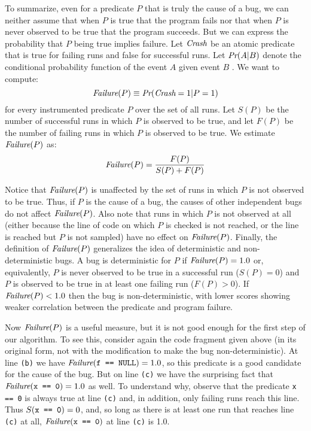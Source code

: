 To summarize, even for a predicate $P$ that is truly the cause of a bug, we can neither assume that
when $P$ is true that
the program fails nor that when $P$ is never observed to be true  that
the program succeeds.
But we can express the probability that $P$
being true implies failure.  Let $\textit{Crash}$ be an atomic predicate that is
true for failing runs and false for successful runs.  Let $\textit{Pr}(A | B)$ denote
the conditional probability function of the event $A$ given event $B$ .  
We want to compute:
\[ \textit{Failure}(P) \equiv \textit{Pr}(\textit{Crash} = 1 | P = 1) \]
for every instrumented predicate $P$ over the set of all runs.  Let $S(P)$ be the number
of successful runs in which $P$ is observed to be true, and let $F(P)$ be the number of
failing runs in which $P$ is observed to be true.  
We estimate $\textit{Failure}(P)$ as:
\[ \textit{Failure}(P) = \frac{F(P)}{S(P) + F(P)} \]

Notice that $\textit{Failure}(P)$ is unaffected by the set of runs in which
$P$ is not observed to be true.  Thus, if $P$ is the cause of a bug, the
causes of other independent bugs do not affect $\textit{Failure}(P)$.
Also note that runs in which $P$ is not observed at all (either because
the line of code on which $P$ is checked is not reached, or the line is reached
but $P$ is not sampled) have no effect on $\textit{Failure}(P)$.
Finally, the definition of $\textit{Failure}(P)$
generalizes the idea of deterministic and non-deterministic bugs.  A
bug is deterministic for $P$ if $\textit{Failure}(P) = 1.0$ or, equivalently,
$P$ is never observed to be true in a successful run ($S(P) =
0$) and $P$ is observed to be true in at least one failing run ($F(P) > 0$).
If $\textit{Failure}(P) < 1.0$ then the bug is non-deterministic, with
lower scores showing weaker correlation between the predicate and
program failure.

Now $\textit{Failure}(P)$ is a useful measure, but it is not good
enough for the first step of our algorithm. To see this, consider again the
code fragment given above (in its original form, not with the
modification to make the bug non-deterministic).  At line {\tt (b)} we
have $\textit{Failure}(\mbox{\tt f == NULL}) = 1.0$, so this predicate is a good
candidate for the cause of the bug.
But on line {\tt (c)} we have the surprising fact that $\textit{Failure}(\mbox{\tt x == 0}) = 1.0$ as well.
To understand why, observe that the 
predicate \texttt{x == 0} is always true at line {\tt (c)} and, in
addition,
only failing runs reach this line.
Thus $S(\mbox{\tt x == 0}) = 0$, and, so long as there is at least one run that
reaches line {\tt (c)} at all, $\textit{Failure}(\mbox{\tt x == 0})$ at line {\tt (c)} is 1.0.

